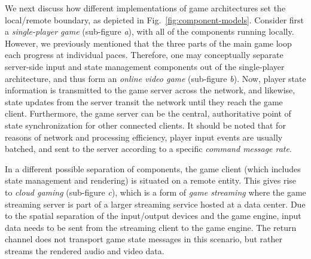 We next discuss how different implementations of game architectures set the local/remote boundary, as depicted in Fig.~\ref{fig:component-models}. Consider first a \textit{single-player game} (sub-figure \textit{a}), with all of the components running locally. However, we previously mentioned that the three parts of the main game loop each progress at individual paces. Therefore, one may conceptually separate server-side input and state management components out of the single-player architecture, and thus form an \textit{online video game} (sub-figure \textit{b}). Now, player state information is transmitted to the game server across the network, and likewise, state updates from the server transit the network until they reach the game client.
Furthermore, the game server can be the central, authoritative point of state synchronization for other connected clients.
It should be noted that for reasons of network and processing efficiency, player input events are usually batched, and sent to the server according to a specific \textit{command message rate}.


In a different possible separation of components, the game client (which includes state management and rendering) is situated on a remote entity. This gives rise to \textit{cloud gaming} (sub-figure \textit{c}), which is a form of \textit{game streaming} where the game streaming server is part of a larger streaming service hosted at a data center. Due to the spatial separation of the input/output devices and the game engine, input data needs to be sent from the streaming client to the game engine. The return channel does not transport game state messages in this scenario, but rather streams the rendered audio and video data.




